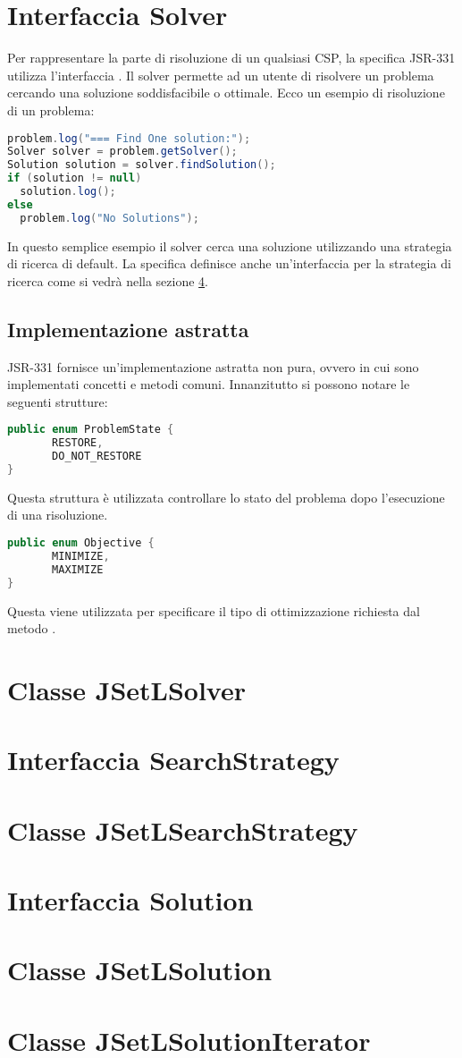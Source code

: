 \section{Interfaccia Solver}\label{solver}
Per rappresentare la parte di risoluzione di un qualsiasi CSP, la specifica
JSR-331 utilizza l'interfaccia . Il solver permette ad un utente
di risolvere un problema cercando una soluzione soddisfacibile o ottimale. Ecco
un esempio di risoluzione di un problema:
\begin{lstlisting}[language = Java,
                   caption = {una risoluzione di \files{problem}.}]
problem.log("=== Find One solution:");
Solver solver = problem.getSolver();
Solution solution = solver.findSolution();
if (solution != null)
  solution.log();
else
  problem.log("No Solutions");
\end{lstlisting}
In questo semplice esempio il solver cerca una soluzione 
utilizzando una strategia di ricerca di default. La specifica definisce anche 
un'interfaccia per la strategia di ricerca come si vedrà nella sezione
\ref{search}.

\subsection{Implementazione astratta}
JSR-331 fornisce un'implementazione astratta non pura, ovvero in cui sono
implementati concetti e metodi comuni. Innanzitutto si possono notare
le seguenti strutture:
\begin{lstlisting}[language = Java,
                   frame = single]
public enum ProblemState {
       RESTORE,
       DO_NOT_RESTORE
}
\end{lstlisting}
Questa struttura è utilizzata controllare lo stato del problema dopo
l'esecuzione di una risoluzione.
\begin{lstlisting}[language = Java,
                   frame = single]
public enum Objective {
       MINIMIZE,
       MAXIMIZE
}
\end{lstlisting}
Questa viene utilizzata per specificare il tipo di ottimizzazione richiesta
dal metodo .



\section{Classe JSetLSolver}\label{jsetlsolver}
\section{Interfaccia SearchStrategy}
\section{Classe JSetLSearchStrategy}\label{search}
\section{Interfaccia Solution}
\section{Classe JSetLSolution}
\section{Classe JSetLSolutionIterator}\label{solIter}

